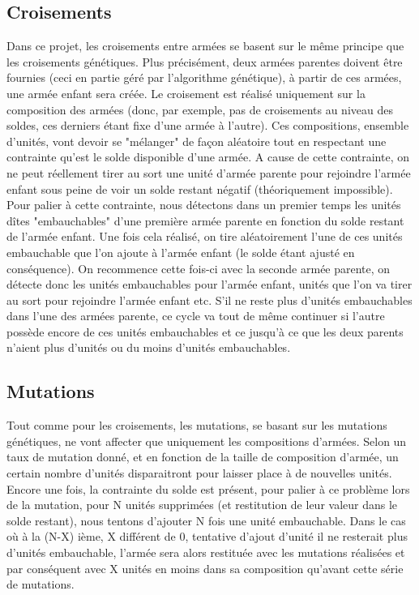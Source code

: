 \documentclass{article}
\begin{document}
\subsection{Croisements}

	Dans ce projet, les croisements entre armées se basent sur le même principe que les croisements génétiques. Plus précisément, deux armées parentes doivent être fournies (ceci en partie géré par l'algorithme génétique), à partir de ces armées, une armée enfant sera créée. Le croisement est réalisé uniquement sur la composition des armées (donc, par exemple, pas de croisements au niveau des soldes, ces derniers étant fixe d'une armée à l'autre). Ces compositions, ensemble d'unités, vont devoir se "mélanger" de façon aléatoire tout en respectant une contrainte qu'est le solde disponible d'une armée. A cause de cette contrainte, on ne peut réellement tirer au sort une unité d'armée parente pour rejoindre l'armée enfant sous peine de voir un solde restant négatif (théoriquement impossible). Pour palier à cette contrainte, nous détectons dans un premier temps les unités dîtes "embauchables" d'une première armée parente en fonction du solde restant de l'armée enfant. Une fois cela réalisé, on tire aléatoirement l'une de ces unités embauchable que l'on ajoute à l'armée enfant (le solde étant ajusté en conséquence). On recommence cette fois-ci avec la seconde armée parente, on détecte donc les unités embauchables pour l'armée enfant, unités que l'on va tirer au sort pour rejoindre l'armée enfant etc. S'il ne reste plus d'unités embauchables dans l'une des armées parente, ce cycle va tout de même continuer si l'autre possède encore de ces unités embauchables et ce jusqu'à ce que les deux parents n'aient plus d'unités ou du moins d'unités embauchables.
	
	
\subsection{Mutations}

	Tout comme pour les croisements, les mutations, se basant sur les mutations génétiques, ne vont affecter que uniquement les compositions d'armées. Selon un taux de mutation donné, et en fonction de la taille de composition d'armée, un certain nombre d'unités disparaitront pour laisser place à de nouvelles unités. Encore une fois, la contrainte du solde est présent, pour palier à ce problème lors de la mutation, pour N unités supprimées (et restitution de leur valeur dans le solde restant), nous tentons d'ajouter N fois une unité embauchable. Dans le cas où à la (N-X) ième, X différent de 0, tentative d'ajout d'unité il ne resterait plus d'unités embauchable, l'armée sera alors restituée avec les mutations réalisées et par conséquent avec X unités en moins dans sa composition qu'avant cette série de mutations.
\end{document}
